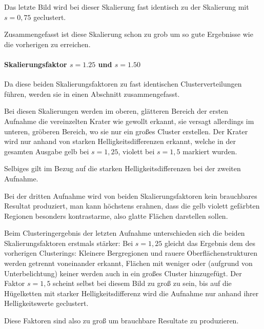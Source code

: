 Das letzte Bild wird bei dieser Skalierung fast identisch zu der Skalierung mit $s=0,75$ geclustert.

Zusammengefasst ist diese Skalierung schon zu grob um so gute Ergebnisse wie die vorherigen zu erreichen.

\paragraph{Skalierungsfaktor $s=1.25$ und $s=1.50$}

Da diese beiden Skalierungsfaktoren zu fast identischen Clusterverteilungen führen, werden sie in einen Abschnitt zusammengefasst.

Bei diesen Skalierungen werden im oberen, glätteren Bereich der ersten Aufnahme die vereinzelten Krater wie gewollt erkannt, sie versagt allerdings im unteren, gröberen Bereich, wo sie nur ein großes Cluster erstellen. Der Krater wird nur anhand von starken Helligkeitsdifferenzen erkannt, welche in der gesamten Ausgabe gelb bei $s=1,25$, \bzw violett bei $s=1,5$ markiert wurden. 

Selbiges gilt im Bezug auf die starken Helligkeitsdifferenzen bei der zweiten Aufnahme.

Bei der dritten Aufnahme wird von beiden Skalierungsfaktoren kein brauchbares Resultat produziert, man kann höchstens erahnen, dass die gelb \bzw violett gefärbten Regionen besonders kontrastarme, also glatte Flächen darstellen sollen.

Beim Clusteringergebnis der letzten Aufnahme unterschieden sich die beiden Skalierungsfaktoren erstmals stärker: Bei $s=1,25$ gleicht das Ergebnis dem des vorherigen Clusterings: Kleinere Bergregionen und rauere Oberflächenstrukturen werden getrennt voneinander erkannt, Flächen mit weniger oder (aufgrund von Unterbelichtung) keiner werden auch in ein großes Cluster hinzugefügt. Der Faktor $s=1,5$ scheint selbst bei diesem Bild zu groß zu sein, bis auf die Hügelketten mit starker Helligkeitsdifferenz wird die Aufnahme nur anhand ihrer Helligkeitswerte geclustert.

Diese Faktoren sind also zu groß um brauchbare Resultate zu produzieren.

